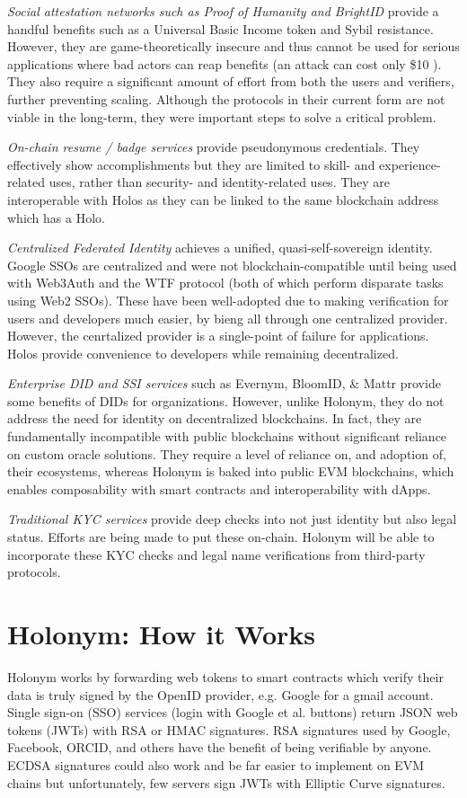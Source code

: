 \documentclass[11pt,oneside,a4paper]{article}
\begin{document}
	\textit{Social attestation networks such as Proof of Humanity and BrightID} provide a handful benefits such as a Universal Basic Income token and Sybil resistance. However, they are game-theoretically insecure and thus cannot be used for serious applications where bad actors can reap benefits (an attack can cost only \$10 \cite{ted}). They also require a significant amount of effort from both the users and verifiers, further preventing scaling. Although the protocols in their current form are not viable in the long-term, they were important steps to solve a critical problem.
	
	\textit{On-chain resume / badge services} provide pseudonymous credentials. They effectively show accomplishments but they are limited to skill- and experience-related uses, rather than security- and identity-related uses. They are interoperable with Holos as they can be linked to the same blockchain address which has a Holo.
	
	\textit{Centralized Federated Identity} achieves a unified, quasi-self-sovereign identity. Google SSOs are centralized and were not blockchain-compatible until being used with Web3Auth and the WTF protocol (both of which perform disparate tasks using Web2 SSOs). These have been well-adopted due to making verification for users and developers much easier, by bieng all through one centralized provider. However, the cenrtalized provider is a single-point of failure for applications. Holos provide  convenience to developers while remaining decentralized.
	
	\textit{Enterprise DID and SSI services} such as Evernym, BloomID, \& Mattr provide some benefits of DIDs for organizations. However, unlike Holonym, they do not address  the need for identity on decentralized blockchains. In fact, they are fundamentally incompatible with public blockchains without significant reliance on custom oracle solutions. They require a level of reliance on, and adoption of, their ecosystems, whereas Holonym is baked into public EVM blockchains, which enables composability with smart contracts and interoperability with dApps.
	
	\textit{Traditional KYC services} provide deep checks into not just identity but also legal status. Efforts are being made to put these on-chain. Holonym will be able to incorporate these KYC checks and legal name verifications from third-party protocols.
	
	\section*{Holonym: How it Works}
		Holonym works by forwarding web tokens to smart contracts which verify their data is truly signed by the OpenID provider, e.g. Google for a gmail account. Single sign-on (SSO) services (login with Google et al. buttons) return JSON web tokens (JWTs) with RSA or HMAC signatures. RSA signatures used by Google, Facebook, ORCID, and others have the benefit of being verifiable by anyone. ECDSA signatures could also work and be far easier to implement on EVM chains but unfortunately, few servers sign JWTs with Elliptic Curve signatures. 
\end{document}
